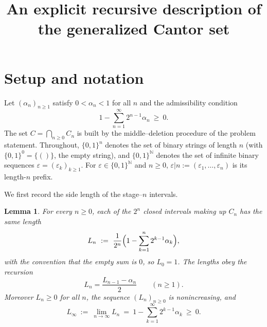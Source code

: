 \documentclass{amsart}
\newtheorem{lemma}{Lemma}
\theoremstyle{definition}
\theoremstyle{remark}
\begin{document}
\title{An explicit recursive description of the generalized Cantor set}
\maketitle

\section{Setup and notation}

Let $(\alpha_n)_{n\ge1}$ satisfy $0<\alpha_n<1$ for all $n$ and the admissibility
condition
\begin{equation}\label{eq:adm}
1-\sum_{n=1}^{\infty}2^{n-1}\alpha_n\ \ge\ 0 .
\end{equation}
The set $C=\bigcap_{n\ge0}C_n$ is built by the middle--deletion procedure of the
problem statement. Throughout, $\{0,1\}^n$ denotes the set of binary strings of
length $n$ (with $\{0,1\}^0=\{()\}$, the empty string), and $\{0,1\}^{\mathbb N}$
denotes the set of infinite binary sequences $\varepsilon=(\varepsilon_k)_{k\ge1}$.
For $\varepsilon\in\{0,1\}^{\mathbb N}$ and $n\ge0$, $\varepsilon|n:=(\varepsilon_1,\dots,\varepsilon_n)$
is its length-$n$ prefix.

We first record the side length of the stage--$n$ intervals.

\begin{lemma}\label{lem:len}
For every $n\ge0$, each of the $2^{n}$ closed intervals making up $C_n$ has the
same length
\begin{equation}\label{eq:Ln}
L_n\ :=\ \frac{1}{2^{n}}\Bigl(1-\sum_{k=1}^{n}2^{k-1}\alpha_k\Bigr),
\end{equation}
with the convention that the empty sum is $0$, so $L_0=1$. The lengths obey the
recursion
\begin{equation}\label{eq:rec}
L_n=\frac{L_{n-1}-\alpha_n}{2}\qquad(n\ge1).
\end{equation}
Moreover $L_n\ge0$ for all $n$, the sequence $(L_n)_{n\ge0}$ is nonincreasing, and
\begin{equation}\label{eq:Linf}
L_\infty\ :=\ \lim_{n\to\infty}L_n\ =\ 1-\sum_{k=1}^{\infty}2^{k-1}\alpha_k\ \ge\ 0 .
\end{equation}
\end{lemma}
\end{document}
